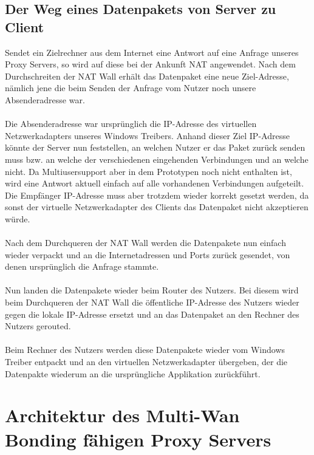 \subsection{Der Weg eines Datenpakets von Server zu Client}
Sendet ein Zielrechner aus dem Internet eine Antwort auf eine Anfrage unseres Proxy Servers, so wird auf diese bei der Ankunft NAT angewendet. Nach dem Durchschreiten der NAT Wall erhält das Datenpaket eine neue Ziel-Adresse, nämlich jene die beim Senden der Anfrage vom Nutzer noch unsere Absenderadresse war.
\\\\
Die Absenderadresse war ursprünglich die IP-Adresse des virtuellen Netzwerkadapters unseres Windows Treibers. Anhand dieser Ziel IP-Adresse könnte der Server nun feststellen, an welchen Nutzer er das Paket zurück senden muss bzw. an welche der verschiedenen eingehenden Verbindungen und an welche nicht. Da Multiusersupport aber in dem Prototypen noch nicht enthalten ist, wird eine Antwort aktuell einfach auf alle vorhandenen Verbindungen aufgeteilt. Die Empfänger IP-Adresse muss aber trotzdem wieder korrekt gesetzt werden, da sonst der virtuelle Netzwerkadapter des Clients das Datenpaket nicht akzeptieren würde.
\\\\
Nach dem Durchqueren der NAT Wall werden die Datenpakete nun einfach wieder verpackt und an die Internetadressen und Ports zurück gesendet, von denen ursprünglich die Anfrage stammte.
\\\\
Nun landen die Datenpakete wieder beim Router des Nutzers. Bei diesem wird beim Durchqueren der NAT Wall die öffentliche IP-Adresse des Nutzers wieder gegen die lokale IP-Adresse ersetzt und an das Datenpaket an den Rechner des Nutzers gerouted.
\\\\ 
Beim Rechner des Nutzers werden diese Datenpakete wieder vom Windows Treiber entpackt und an den virtuellen Netzwerkadapter übergeben, der die Datenpakte wiederum an die ursprüngliche Applikation zurückführt.


\section{Architektur des Multi-Wan Bonding fähigen Proxy Servers}
